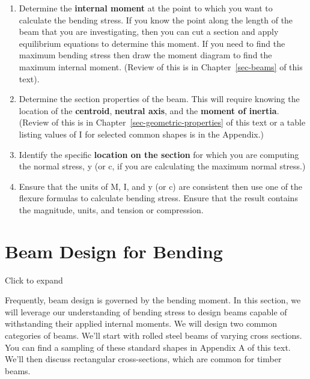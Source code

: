 \documentclass[
  letterpaper,
  DIV=11,
  numbers=noendperiod]{scrreprt}
\providecommand{\tightlist}{%
  \setlength{\itemsep}{0pt}\setlength{\parskip}{0pt}}\usepackage{longtable,booktabs,array}
\theoremstyle{definition}
\theoremstyle{remark}
\begin{document}
\begin{tcolorbox}[enhanced jigsaw, leftrule=.75mm, colbacktitle=quarto-callout-warning-color!10!white, breakable, opacityback=0, colback=white, titlerule=0mm, toprule=.15mm, colframe=quarto-callout-warning-color-frame, coltitle=black, title=\textcolor{quarto-callout-warning-color}{\faExclamationTriangle}\hspace{0.5em}{Step-by-step: Calculating Bending Stress}, toptitle=1mm, bottomrule=.15mm, rightrule=.15mm, left=2mm, arc=.35mm, opacitybacktitle=0.6, bottomtitle=1mm]

\begin{enumerate}
\def\labelenumi{\arabic{enumi}.}
\tightlist
\item
  Determine the \textbf{internal moment} at the point to which you want
  to calculate the bending stress. If you know the point along the
  length of the beam that you are investigating, then you can cut a
  section and apply equilibrium equations to determine this moment. If
  you need to find the maximum bending stress then draw the moment
  diagram to find the maximum internal moment. (Review of this is in
  Chapter~\ref{sec-beams} of this text).
\item
  Determine the section properties of the beam. This will require
  knowing the location of the \textbf{centroid}, \textbf{neutral axis},
  and the \textbf{moment of inertia}. (Review of this is in
  Chapter~\ref{sec-geometric-properties} of this text or a table listing
  values of I for selected common shapes is in the Appendix.)
\item
  Identify the specific \textbf{location on the section} for which you
  are computing the normal stress, y (or c, if you are calculating the
  maximum normal stress.)
\item
  Ensure that the units of M, I, and y (or c) are consistent then use
  one of the flexure formulas to calculate bending stress. Ensure that
  the result contains the magnitude, units, and tension or compression.
\end{enumerate}

\end{tcolorbox}

\section{Beam Design for Bending}\label{sec-9.2}

Click to expand

Frequently, beam design is governed by the bending moment. In this
section, we will leverage our understanding of bending stress to design
beams capable of withstanding their applied internal moments. We will
design two common categories of beams. We'll start with rolled steel
beams of varying cross sections. You can find a sampling of these
standard shapes in Appendix A of this text. We'll then discuss
rectangular cross-sections, which are common for timber beams.
\end{document}
